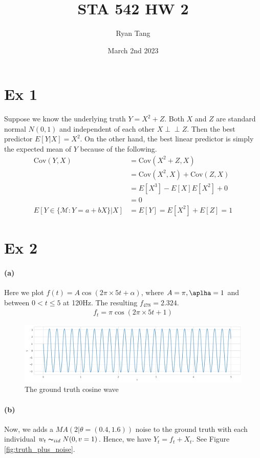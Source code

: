 \documentclass[11pt, letterpaper]{article}
\author{Ryan Tang}
\title{STA 542 HW 2}
\date{March 2nd 2023}
\newcommand{\indep}{\perp \!\!\! \perp}
\begin{document}
\maketitle

\section{Ex 1}
Suppose we know the underlying truth $Y = X^2 + Z$. Both $X$ and $Z$ are standard normal $N(0,1)$ and independent of each other $X \indep Z$. Then the best predictor $E[Y|X] = X^2$. On the other hand, the best linear predictor is simply the expected mean of $Y$ because of the following.
\begin{align*}
    \text{Cov}(Y, X) &= \text{Cov}(X^2 + Z, X) \\
        &= \text{Cov}(X^2, X) + \text{Cov}(Z, X) \\
        &= E[X^3] - E[X]E[X^2] + 0 \\
        &= 0 \\
    E[Y \in \{\mathcal{M}: Y = a + bX\}|X] &= E[Y] = E[X^2] + E[Z] = 1
\end{align*}

\section{Ex 2}
\paragraph{(a)}
Here we plot $f(t) = A \cos(2\pi \times 5t + \alpha)$, where $A = \pi, \aplha = 1$ and between $0 < t \leq 5$ at 120Hz. The resulting $f_{478} = 2.324$.
\begin{align*}
    f_t = \pi \cos(2\pi \times 5t + 1)
\end{align*}

\begin{figure}[!h]
  \centering
  \includegraphics[width=1.0\textwidth]{plot1.png}
  \captionsetup{justification=centering}
  \caption{The ground truth cosine wave}
\end{figure}

\paragraph{(b)}
Now, we adds a $MA(2|\theta=(0.4, 1.6))$ noise to the ground truth with each individual $w_t \thicksim_{iid} N(0,v=1)$. Hence, we have $Y_t = f_t + X_t$. See Figure \ref{fig:truth_plus_noise}.
\end{document}
